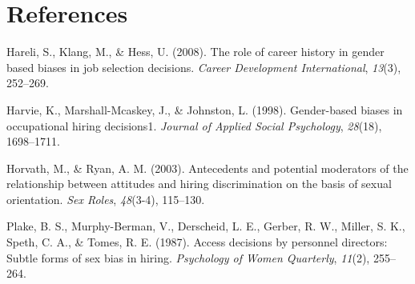 \documentclass[english,man]{apa6}
\theoremstyle{definition}
\theoremstyle{definition}
\theoremstyle{remark}
\begin{document}
\newpage

\section{References}\label{references}

\setlength{\parindent}{-0.5in} \setlength{\leftskip}{0.5in}

\hypertarget{refs}{}
\hypertarget{ref-hareli2008role}{}
Hareli, S., Klang, M., \& Hess, U. (2008). The role of career history in
gender based biases in job selection decisions. \emph{Career Development
International}, \emph{13}(3), 252--269.

\hypertarget{ref-harvie1998gender}{}
Harvie, K., Marshall-Mcaskey, J., \& Johnston, L. (1998). Gender-based
biases in occupational hiring decisions1. \emph{Journal of Applied
Social Psychology}, \emph{28}(18), 1698--1711.

\hypertarget{ref-horvath2003antecedents}{}
Horvath, M., \& Ryan, A. M. (2003). Antecedents and potential moderators
of the relationship between attitudes and hiring discrimination on the
basis of sexual orientation. \emph{Sex Roles}, \emph{48}(3-4), 115--130.

\hypertarget{ref-plake1987access}{}
Plake, B. S., Murphy-Berman, V., Derscheid, L. E., Gerber, R. W.,
Miller, S. K., Speth, C. A., \& Tomes, R. E. (1987). Access decisions by
personnel directors: Subtle forms of sex bias in hiring.
\emph{Psychology of Women Quarterly}, \emph{11}(2), 255--264.
\end{document}
